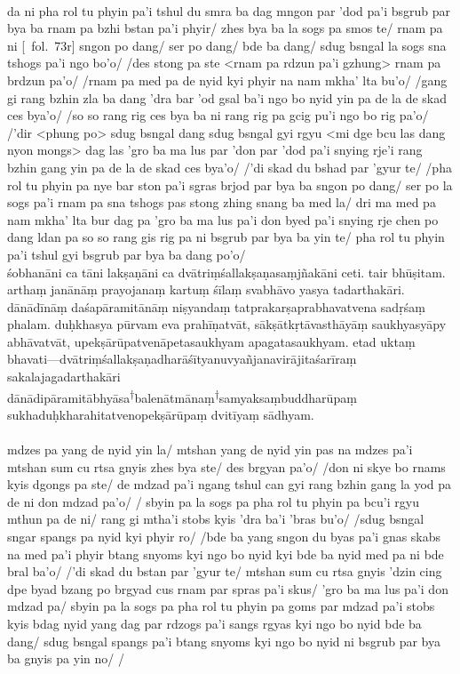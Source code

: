 \documentclass[12pt]{article}
\newcommand{\crux} {\hspace{0em}\textsuperscript{†}\hspace{0em}}
\newcommand{\emdash} {\hspace{0em}—\hspace{0em}}
\begin{document}
\textbf{\TVB}\\
da ni pha rol tu phyin pa'i tshul du smra ba dag mngon par 'dod pa'i bsgrub par bya ba rnam pa bzhi bstan pa'i phyir/ zhes bya ba la sogs pa smos te/ rnam pa ni [\TVB\ fol.\ 73r] sngon po dang/ ser po dang/ bde ba dang/ sdug bsngal la sogs sna tshogs pa'i ngo bo'o/ /des stong pa ste <rnam pa rdzun pa'i gzhung> rnam pa brdzun pa'o/ /rnam pa med pa de nyid kyi phyir na nam mkha' lta bu'o/ /gang gi rang bzhin zla ba dang 'dra bar 'od gsal ba'i ngo bo nyid yin pa de la de skad ces bya'o/ /so so rang rig ces bya ba ni rang rig pa gcig pu'i ngo bo rig pa'o/ /'dir <phung po> sdug bsngal dang sdug bsngal gyi rgyu <mi dge bcu las dang nyon mongs> dag las 'gro ba ma lus par 'don par 'dod pa'i snying rje'i rang bzhin gang yin pa de la de skad ces bya'o/ /'di skad du bshad par 'gyur te/ /pha rol tu phyin pa nye bar ston pa'i sgras brjod par bya ba sngon po dang/ ser po la sogs pa'i rnam pa sna tshogs pas stong zhing snang ba med la/ dri ma med pa nam mkha' lta bur dag pa 'gro ba ma lus pa'i don byed pa'i snying rje chen po dang ldan pa so so rang gis rig pa ni bsgrub par bya ba yin te/ pha rol tu phyin pa'i tshul gyi bsgrub par bya ba dang po'o/\\

śobhanāni ca tāni lakṣaṇāni ca dvātriṃśallakṣaṇasaṃjñakāni ceti.
tair bhūṣitam.
arthaṃ janānāṃ prayojanaṃ kartuṃ śīlaṃ svabhāvo yasya tadarthakāri.
dānādīnāṃ daśapāramitānāṃ niṣyandaṃ tatprakarṣaprabhavatvena sadṛśaṃ phalam.
duḥkhasya pūrvam eva prahīṇatvāt, sākṣātkṛtāvasthāyāṃ\footnoteB{
	sākṣātkṛtāvasthāyāṃ] \EDD; sākṣātkṛtāvatāsthāyāṃ \MS
} saukhyasyāpy abhāvatvāt, upekṣārūpatvenāpetasaukhyam apagatasaukhyam.
etad uktaṃ bhavati\emdash dvātriṃśallakṣaṇadharāśītyanuvyañjanavirājitaśarīraṃ sakalajagadarthakāri dānādipāramitābhyāsa\crux balenātmānaṃ\footnoteB{
	°balenātmānaṃ] \MS\ \EDD; stobs kyis bdag nyid yang dag par rdzogs pa'i \TVA; stobs kyis byung ba yang dag par \TVB
}\crux samyaksaṃbuddharūpaṃ sukhaduḥkharahitatvenopekṣārūpaṃ dvitīyaṃ sādhyam.\\

\textbf{\TVA}\\
mdzes pa yang de nyid yin la/ mtshan yang de nyid yin pas na mdzes pa'i mtshan sum cu rtsa gnyis zhes bya ste/ des brgyan pa'o/ /don ni skye bo rnams kyis dgongs pa ste/ de mdzad pa'i ngang tshul can gyi rang bzhin gang la yod pa de ni don mdzad pa'o/ / sbyin pa la sogs pa pha rol tu phyin pa bcu'i rgyu mthun pa de ni/ rang gi mtha'i stobs kyis 'dra ba'i 'bras bu'o/ /sdug bsngal sngar spangs pa nyid kyi phyir ro/ /bde ba yang sngon du byas pa'i gnas skabs na med pa'i phyir btang snyoms kyi ngo bo nyid kyi bde ba nyid med pa ni bde bral ba'o/ /'di skad du bstan par 'gyur te/ mtshan sum cu rtsa gnyis 'dzin cing dpe byad bzang po brgyad cus rnam par spras pa'i skus/ 'gro ba ma lus pa'i don mdzad pa/ sbyin pa la sogs pa pha rol tu phyin pa goms par mdzad pa'i stobs kyis bdag nyid yang dag par rdzogs pa'i sangs rgyas kyi ngo bo nyid bde ba dang/ sdug bsngal spangs pa'i btang snyoms kyi ngo bo nyid ni bsgrub par bya ba gnyis pa yin no/ /\\
\end{document}
